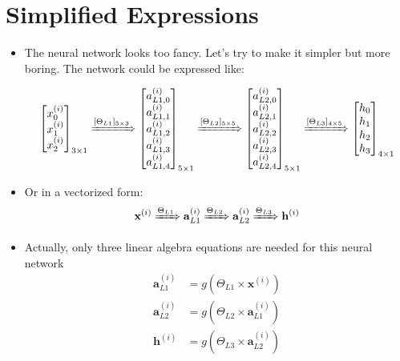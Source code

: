 \section{Simplified Expressions}
\begin{itemize}
    \item The neural network looks too fancy. Let's try to make it simpler but more boring. The network could be expressed like:

    \begin{equation}
        \left[\begin{matrix} x^{(i)}_0 \\ x^{(i)}_1 \\ x^{(i)}_2 \end{matrix}\right]_{3 \times 1} \xRightarrow{[\Theta_{L1}]_{5 \times 3}}
        \left[\begin{matrix} a^{(i)}_{L1, 0} \\ a^{(i)}_{L1, 1} \\ a^{(i)}_{L1, 2} \\ a^{(i)}_{L1, 3} \\ a^{(i)}_{L1, 4} \end{matrix}\right]_{5 \times 1} \xRightarrow{[\Theta_{L2}]_{5 \times 5}}
        \left[\begin{matrix} a^{(i)}_{L2, 0} \\ a^{(i)}_{L2, 1} \\ a^{(i)}_{L2, 2} \\ a^{(i)}_{L2, 3} \\ a^{(i)}_{L2, 4} \end{matrix}\right]_{5 \times 1} \xRightarrow{[\Theta_{L3}]_{4 \times 5}}
        \left[\begin{matrix} h_0 \\ h_1 \\ h_2 \\ h_3 \end{matrix}\right]_{4 \times 1}
    \end{equation}

    \item Or in a vectorized form:
    \begin{equation}
        \mathbf{x}^{(i)} \xRightarrow{\Theta_{L1}}
        \mathbf{a}^{(i)}_{L1} \xRightarrow{\Theta_{L2}}
        \mathbf{a}^{(i)}_{L2} \xRightarrow{\Theta_{L3}}
        \mathbf{h}^{(i)}
    \end{equation}

    \item Actually, only three linear algebra equations are needed for this neural network
    \begin{equation}
        \begin{aligned}
            \mathbf{a}^{(i)}_{L1} &= g(\Theta_{L1} \times \mathbf{x}^{(i)})\\
            \mathbf{a}^{(i)}_{L2} &= g(\Theta_{L2} \times \mathbf{a}^{(i)}_{L1})\\
            \mathbf{h}^{(i)}      &= g(\Theta_{L3} \times \mathbf{a}^{(i)}_{L2})\\
        \end{aligned}
    \end{equation}
\end{itemize}

